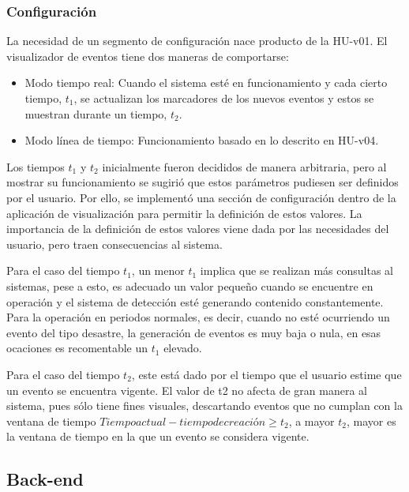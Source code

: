 \subsubsection*{Configuración}
\label{subsubsec:config}

La necesidad de un segmento de configuración nace producto de la HU-v01. El visualizador de eventos tiene dos maneras de comportarse:

\begin{itemize}
\item Modo tiempo real: Cuando el sistema esté en funcionamiento y cada cierto tiempo, $t_{1}$, se actualizan los marcadores de los nuevos eventos y estos se muestran durante un tiempo, $t_{2}$.
\item Modo línea de tiempo: Funcionamiento basado en lo descrito en HU-v04.
\end{itemize}

Los tiempos $t_{1}$ y $t_{2}$ inicialmente fueron decididos de manera arbitraria, pero al mostrar su funcionamiento se sugirió que estos parámetros pudiesen ser definidos por el usuario. Por ello, se implementó una sección de configuración dentro de la aplicación de visualización para permitir la definición de estos valores. La importancia de la definición de estos valores viene dada por las necesidades del usuario, pero traen consecuencias al sistema.

Para el caso del tiempo $t_{1}$, un menor $t_{1}$ implica que se realizan más consultas al sistemas, pese a esto, es adecuado un valor pequeño cuando se encuentre en operación y el sistema de detección esté generando contenido constantemente. Para la operación en periodos normales, es decir, cuando no esté ocurriendo un evento del tipo desastre, la generación de eventos es muy baja o nula, en esas ocaciones es recomentable un $t_{1}$ elevado.

Para el caso del tiempo $t_{2}$, este está dado por el tiempo que el usuario estime que un evento se encuentra vigente. El valor de t2 no afecta de gran manera al sistema, pues sólo tiene fines visuales, descartando eventos que no cumplan con la ventana de tiempo $Tiempo actual - tiempo de creación \geq t_{2}$, a mayor $t_{2}$, mayor es la ventana de tiempo en la que un evento se considera vigente.

\subsection{Back-end}
\label{subsec:detectorNecesidades}


